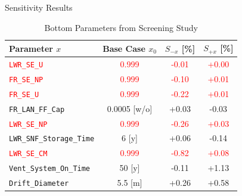 \documentclass[pdf, autumn, slideColor, nocolorBG]{prosper}
\newcommand{\Red}[1]{\textcolor{red}{#1}}
\begin{document}
\begin{slide}{Sensitivity Results}
\begin{center}
\begin{table}
\scriptsize
\caption{Bottom Parameters from Screening Study}
\begin{tabular}{|l|c|c|c|}
\hline
\textbf{Parameter $x$}           & \textbf{Base Case $x_0$}    & \textbf{$S_{-x}$} [\%] & \textbf{$S_{+x}$} [\%]\\
\hline
\Red{\texttt{LWR\_SE\_U}}        & \Red{0.999}                 & \Red{-0.01}      & \Red{+0.00} \\
\hline
\Red{\texttt{FR\_SE\_NP}}        & \Red{0.999}                 & \Red{-0.10}      & \Red{+0.01} \\
\hline
\Red{\texttt{FR\_SE\_U}}         & \Red{0.999}                 & \Red{-0.22}      & \Red{+0.01} \\
\hline
\texttt{FR\_LAN\_FF\_Cap}        & 0.0005 [w/o]                & +0.03            & -0.03 \\
\hline
\Red{\texttt{LWR\_SE\_NP}}       & \Red{0.999}                 & \Red{-0.26}      & \Red{+0.03} \\
\hline
\texttt{LWR\_SNF\_Storage\_Time} & 6 [y]                       & +0.06            & -0.14 \\
\hline
\Red{\texttt{LWR\_SE\_CM}}       & \Red{0.999}                 & \Red{-0.82}      & \Red{+0.08} \\
\hline
\texttt{Vent\_System\_On\_Time}  & 50 [y]                      & -0.11            & +1.13 \\
\hline
\texttt{Drift\_Diameter}         & 5.5 [m]                     & +0.26            & +0.58 \\
\hline
\end{tabular}
\end{table}
\end{center}
\end{slide}
\end{document}
